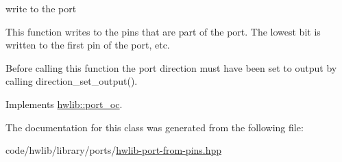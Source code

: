 write to the port

This function writes to the pins that are part of the port. The lowest bit is written to the first pin of the port, etc.

Before calling this function the port direction must have been set to output by calling direction\+\_\+set\+\_\+output(). 

Implements \hyperlink{classhwlib_1_1port__oc_aa5889aedda709f045730db9859e4fcf4}{hwlib\+::port\+\_\+oc}.



The documentation for this class was generated from the following file\+:\begin{DoxyCompactItemize}
\item 
code/hwlib/library/ports/\hyperlink{hwlib-port-from-pins_8hpp}{hwlib-\/port-\/from-\/pins.\+hpp}\end{DoxyCompactItemize}
